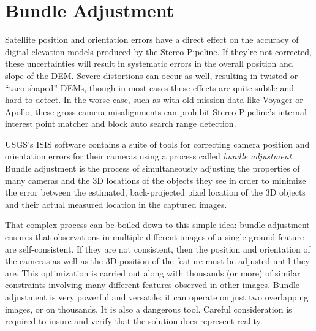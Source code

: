 \chapter{Bundle Adjustment}
\label{ch:bundle_adjustment}

\newenvironment{myindentpar}[1]
               {\begin{list}{}
                   {\setlength{\leftmargin}{#1}}
                 \item[]
               }
               {\end{list}}


Satellite position and orientation errors have a direct effect on the
accuracy of digital elevation models produced by the Stereo Pipeline.
If they're not corrected, these uncertainties will result in
systematic errors in the overall position and slope of the \ac{DEM}.
Severe distortions can occur as well, resulting in twisted or ``taco
shaped'' \acp{DEM}, though in most cases these effects are quite
subtle and hard to detect. In the worse case, such as with old mission
data like Voyager or Apollo, these gross camera misalignments can
prohibit Stereo Pipeline's internal interest point matcher and block
auto search range detection.

USGS's \ac{ISIS} software contains a suite of tools for correcting camera
position and orientation errors for their cameras using a process
called \emph{bundle adjustment}. Bundle adjustment is the process of
simultaneously adjusting the properties of many cameras and the 3D
locations of the objects they see in order to minimize the error
between the estimated, back-projected pixel location of the 3D objects
and their actual measured location in the captured images.

That complex process can be boiled down to this simple idea: bundle
adjustment ensures that observations in multiple different images of a
single ground feature are self-consistent. If they are not consistent,
then the position and orientation of the cameras as well as the 3D
position of the feature must be adjusted until they are.  This
optimization is carried out along with thousands (or more) of similar
constraints involving many different features observed in other
images.  Bundle adjustment is very powerful and versatile: it can
operate on just two overlapping images, or on thousands. It is also a
dangerous tool. Careful consideration is required to insure and
verify that the solution does represent reality.

